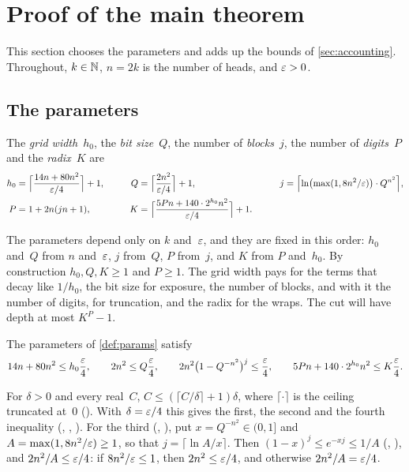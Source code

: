 \section{Proof of the main theorem}\label{sec:proof}

This section chooses the parameters and adds up the bounds of \cref{sec:accounting}. Throughout, $k\in\mathbb{N}$, $n=2k$ is the number
of heads, and $\varepsilon>0$.

\subsection{The parameters}\label{sec:proof-params}

\begin{definition}\label{def:params}
The \emph{grid width}~$h_0$, the \emph{bit size}~$Q$, the number of \emph{blocks}~$j$, the number of \emph{digits}~$P$ and the
\emph{radix}~$K$ are
\[
\begin{aligned}
  h_0&=\Bigl\lceil\frac{14n+80n^2}{\varepsilon/4}\Bigr\rceil+1, &\qquad
  Q&=\Bigl\lceil\frac{2n^2}{\varepsilon/4}\Bigr\rceil+1, &\qquad
  j&=\Bigl\lceil\ln\bigl(\max(1,8n^2/\varepsilon)\bigr)\cdot Q^{n^2}\Bigr\rceil,\\
  P&=1+2n(jn+1), &
  K&=\Bigl\lceil\frac{5Pn+140\cdot2^{h_0}n^2}{\varepsilon/4}\Bigr\rceil+1. &&
\end{aligned}
\]
\end{definition}

The parameters depend only on $k$ and~$\varepsilon$, and they are fixed in this order: $h_0$ and~$Q$ from $n$ and~$\varepsilon$, $j$ from~$Q$,
$P$ from~$j$, and $K$ from $P$ and~$h_0$. By construction $h_0,Q,K\ge1$ and $P\ge1$. The grid width pays for the terms that decay
like $1/h_0$, the bit size for exposure, the number of blocks, and with it the number of digits, for truncation, and the radix for
the wraps. The cut will have depth at most $K^P-1$.

\begin{lemma}\label{lem:params}
The parameters of \cref{def:params} satisfy
\[
  14n+80n^2\le h_0\frac{\varepsilon}4,\qquad 2n^2\le Q\frac{\varepsilon}4,\qquad 2n^2\bigl(1-Q^{-n^2}\bigr)^j\le\frac{\varepsilon}4,\qquad
  5Pn+140\cdot2^{h_0}n^2\le K\frac{\varepsilon}4.
\]
\end{lemma}

\begin{outline}
For $\delta>0$ and every real~$C$, $C\le(\lceil C/\delta\rceil+1)\delta$, where $\lceil\cdot\rceil$ is the ceiling truncated at~$0$
(). With $\delta=\varepsilon/4$ this gives the first, the second and the
fourth inequality (, , ). For the third (, ),
put $x=Q^{-n^2}\in(0,1]$ and $A=\max(1,8n^2/\varepsilon)\ge1$, so that $j=\lceil\ln A/x\rceil$. Then $(1-x)^j\le e^{-xj}\le1/A$
(, ), and $2n^2/A\le\varepsilon/4$: if $8n^2/\varepsilon\le1$, then $2n^2\le\varepsilon/4$,
and otherwise $2n^2/A=\varepsilon/4$.
\end{outline}

